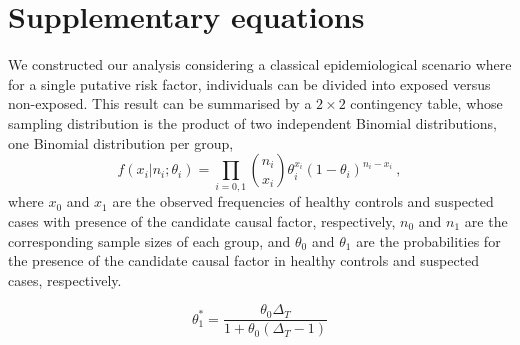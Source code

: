 \section{Supplementary equations}

We constructed our analysis considering a classical epidemiological scenario where for a single putative risk factor, individuals can be divided into exposed versus non-exposed. This result can be summarised by a $2 \times 2$ contingency table, whose sampling distribution is the product of two independent Binomial distributions, one Binomial distribution per group,
% 
\begin{equation}
    f(x_i | n_i; \theta_i) = \prod_{i = 0,1} \binom{n_i}{x_i} \theta_{i}^{x_i} (1-\theta_i)^{n_i - x_i}\ ,
    \label{appendix:sample-distribution-01}
\end{equation}
% 
where $x_0$ and $x_1$ are the observed frequencies of healthy controls and suspected cases with presence of the candidate causal factor, respectively, $n_0$ and $n_1$ are the corresponding sample sizes of each group, and $\theta_0$ and $\theta_1$ are the probabilities for the presence of the candidate causal factor in healthy controls and suspected cases, respectively.


\begin{equation}
    \theta_{1}^{*} = \frac{\theta_0 \Delta_T}{1 + \theta_0 \left(\Delta_T - 1\right)}
    \label{appendix:true-t1}
\end{equation}
